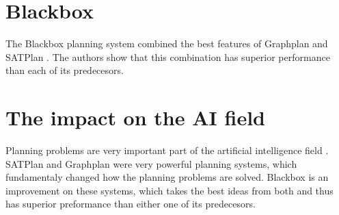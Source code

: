 \documentclass[11pt]{article}
\begin{document}
  \section{Blackbox}
  
  The Blackbox planning system combined the best features of Graphplan and SATPlan \autocite{kautz1999unifying}. The authors show that this combination has superior performance than each of its predecesors.
  
  \section{The impact on the AI field}
  
  Planning problems are very important part of the artificial intelligence field \autocite{russell2010artificial}. SATPlan and Graphplan were very powerful planning systems, which fundamentaly changed how the planning problems are solved. Blackbox is an improvement on these systems, which takes the best ideas from both and thus has superior preformance than either one of its predecesors.
  
  \printbibliography

  
\end{document}
